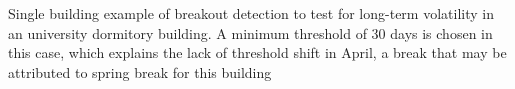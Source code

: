 Single building example of breakout detection to test for long-term volatility in an university dormitory building. A minimum threshold of 30 days is chosen in this case, which explains the lack of threshold shift in April, a break that may be attributed to spring break for this building
\label{fig:breakout_single}
